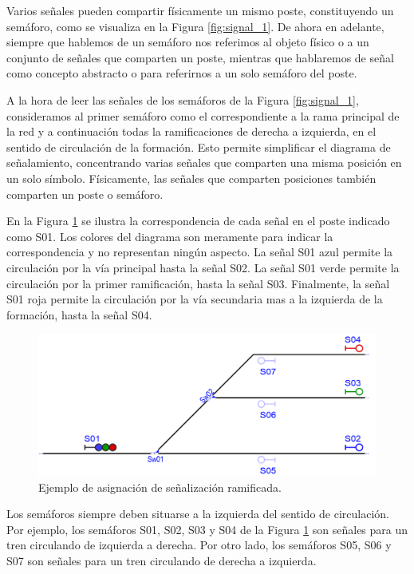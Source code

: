     Varios señales pueden compartir físicamente un mismo poste, constituyendo un semáforo, como se visualiza en la Figura \ref{fig:signal_1}. De ahora en adelante, siempre que hablemos de un semáforo nos referimos al objeto físico o a un conjunto de señales que comparten un poste, mientras que hablaremos de señal como concepto abstracto o para referirnos a un solo semáforo del poste.
    
    A la hora de leer las señales de los semáforos de la Figura \ref{fig:signal_1}, consideramos al primer semáforo como el correspondiente a la rama principal de la red y a continuación todas la ramificaciones de derecha a izquierda, en el sentido de circulación de la formación. Esto permite simplificar el diagrama de señalamiento, concentrando varias señales que comparten una misma posición en un solo símbolo. Físicamente, las señales que comparten posiciones también comparten un poste o semáforo.

    En la Figura \ref{fig:signal_2} se ilustra la correspondencia de cada señal en el poste indicado como S01. Los colores del diagrama son meramente para indicar la correspondencia y no representan ningún aspecto. La señal S01 azul permite la circulación por la vía principal hasta la señal S02. La señal S01 verde permite la circulación por la primer ramificación, hasta la señal S03. Finalmente, la señal S01 roja permite la circulación por la vía secundaria mas a la izquierda de la formación, hasta la señal S04.

    \begin{figure}[!h]
        \centering
        \includegraphics[width=1\textwidth]{Figuras/semaforos.PNG}
        \centering\caption{Ejemplo de asignación de señalización ramificada.}
        \label{fig:signal_2}
    \end{figure}

    Los semáforos siempre deben situarse a la izquierda del sentido de circulación. Por ejemplo, los semáforos S01, S02, S03 y S04 de la Figura \ref{fig:signal_2} son señales para un tren circulando de izquierda a derecha. Por otro lado, los semáforos S05, S06 y S07 son señales para un tren circulando de derecha a izquierda.